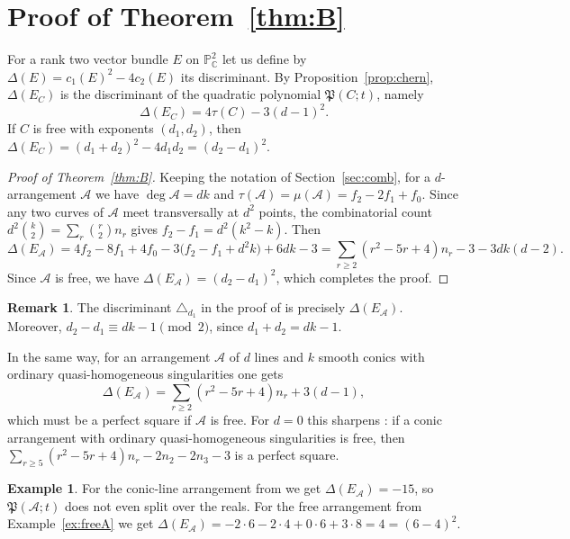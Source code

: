 \documentclass[11pt]{amsart}
\theoremstyle{definition}
\newtheorem{remark}[theorem]{Remark}
\newtheorem{example}[theorem]{Example}
\numberwithin{equation}{section}
\newcommand{\PP}{\mathbb{P}}
\newcommand{\CC}{\mathbb{C}}
\newcommand{\cA}{\mathcal{A}}
\newcommand{\Pfrak}{\mathfrak{P}}
\begin{document}
\section{Proof of Theorem~\ref{thm:B}}\label{sec:B}

For a rank two vector bundle $E$ on $\PP^2_\CC$ let us define by $\Delta(E)=c_1(E)^2-4c_2(E)$ its discriminant.
By Proposition~\ref{prop:chern}, $\Delta(E_C)$ is the discriminant of the quadratic polynomial $\Pfrak(C;t)$, namely
\[
\Delta(E_C)=4\tau(C)-3(d-1)^2 .
\]
If $C$ is free with exponents $(d_1,d_2)$, then $\Delta(E_C)=(d_1+d_2)^2-4d_1d_2=(d_2-d_1)^2$.

\begin{proof}[Proof of Theorem~\ref{thm:B}]
Keeping the notation of Section~\ref{sec:comb}, for a $d$-arrangement $\cA$ we have $\deg\cA=dk$ and $\tau(\cA)=\mu(\cA)=f_2-2f_1+f_0$.
Since any two curves of $\cA$ meet transversally at $d^2$ points, the combinatorial count $d^2\binom k2=\sum_r\binom r2n_r$ gives $f_2-f_1=d^2(k^2-k)$.
Then
\[
\Delta(E_\cA)=4f_2-8f_1+4f_0-3\bigl(f_2-f_1+d^2k\bigr)+6dk-3=\sum_{r\ge2}(r^2-5r+4)n_r-3-3dk(d-2).
\]
Since $\cA$ is free, we have $\Delta(E_\cA)=(d_2-d_1)^2$, which completes the proof.
\end{proof}

\begin{remark}\label{rem:disc}
The discriminant $\triangle_{d_1}$ in the proof of \cite[Theorem~1.8]{Po25} is precisely $\Delta(E_\cA)$.
Moreover, $d_2-d_1\equiv dk-1\pmod 2$, since $d_1+d_2=dk-1$.

In the same way, for an arrangement $\cA$ of $d$ lines and $k$ smooth conics with ordinary quasi-homogeneous singularities one gets
\[
\Delta(E_\cA)=\sum_{r\ge2}(r^2-5r+4)n_r+3(d-1),
\]
which must be a perfect square if $\cA$ is free.
For $d=0$ this sharpens \cite[Remark~3.11]{Po25}: if a conic arrangement with ordinary quasi-homogeneous singularities is free, then $\sum_{r\ge5}(r^2-5r+4)n_r-2n_2-2n_3-3$ is a perfect square.
\end{remark}

\begin{example}
For the conic-line arrangement from \cite[Example~3.2]{Po25} we get $\Delta(E_\cA)=-15$, so $\Pfrak(\cA;t)$ does not even split over the reals.
For the free arrangement from Example~\ref{ex:freeA} we get $\Delta(E_\cA)=-2\cdot6-2\cdot4+0\cdot6+3\cdot8=4=(6-4)^2$.
\end{example}
\end{document}
